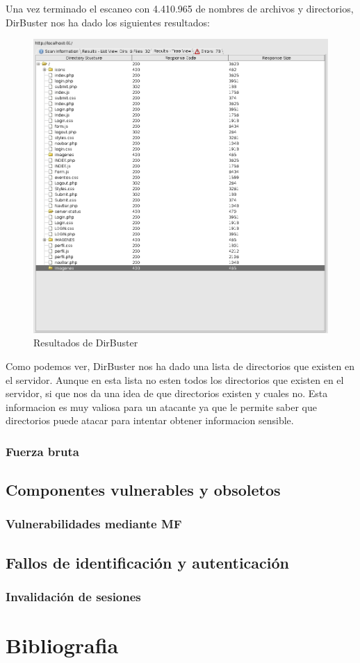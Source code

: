 \documentclass{report}
\begin{document}
                \clearpage
                Una vez terminado el escaneo con 4.410.965 de nombres de archivos y directorios, DirBuster nos ha dado los siguientes resultados:
                \begin{figure}[H]
                    \centering
                    \includegraphics[width=1\textwidth]{./img/vulnerabilidades/2.4/2.2.png}
                    \caption{Resultados de DirBuster}
                \end{figure}
                Como podemos ver, DirBuster nos ha dado una lista de directorios que existen en el servidor.
                Aunque en esta lista no esten todos los directorios que existen en el servidor, si que nos da una idea de que directorios existen y cuales no.
                Esta informacion es muy valiosa para un atacante ya que le permite saber que directorios puede atacar para intentar obtener informacion sensible.\\
                

            \clearpage
            \subsection{Fuerza bruta}
            \clearpage
        \section{Componentes vulnerables y obsoletos}
            \subsection{Vulnerabilidades mediante MF}
            \clearpage
        \section{Fallos de identificación y autenticación}
            \subsection{Invalidación de sesiones}
            \clearpage
    \chapter{Bibliografia}
\end{document}
